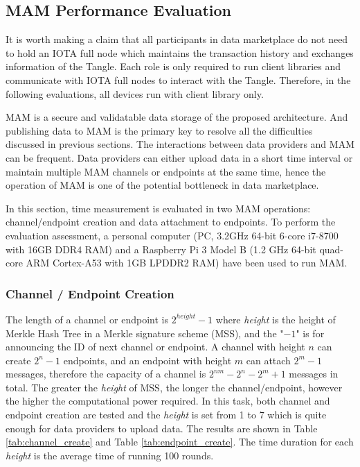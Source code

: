 \documentclass[conference]{IEEEtran}
\begin{document}
\subsection{MAM Performance Evaluation}
\label{section:mam_performance}
It is worth making a claim that all participants in data marketplace do not need to hold an IOTA full node which maintains the transaction history and exchanges information of the Tangle. Each role is only required to run client libraries and communicate with IOTA full nodes to interact with the Tangle. Therefore, in the following evaluations, all devices run with client library only.

MAM is a secure and validatable data storage of the proposed architecture. And publishing data to MAM is the primary key to resolve all the difficulties discussed in previous sections. The interactions between data providers and MAM can be frequent. Data providers can either upload data in a short time interval or maintain multiple MAM channels or endpoints at the same time, hence the operation of MAM is one of the potential bottleneck in data marketplace.

In this section, time measurement is evaluated in two MAM operations: channel/endpoint creation and data attachment to endpoints. To perform the evaluation assessment, a personal computer (PC, 3.2GHz 64-bit 6-core i7-8700 with 16GB DDR4 RAM) and a Raspberry Pi 3 Model B (1.2 GHz 64-bit quad-core ARM Cortex-A53 with 1GB LPDDR2 RAM) have been used to run MAM. 

\subsubsection{Channel / Endpoint Creation}
The length of a channel or endpoint is $2^{height}-1$ where \textit{height} is the height of Merkle Hash Tree in a Merkle signature scheme (MSS), and the "$-1$" is for announcing the ID of next channel or endpoint. A channel with height $n$ can create $2^n-1$ endpoints, and an endpoint with height $m$ can attach $2^m-1$ messages, therefore the capacity of a channel is $2^{nm}-2^n-2^m+1$ messages in total. The greater the \textit{height} of MSS, the longer the channel/endpoint, however the higher the computational power required. In this task, both channel and endpoint creation are tested and the \textit{height} is set from 1 to 7 which is quite enough for data providers to upload data. The results are shown in Table \ref{tab:channel_create} and Table \ref{tab:endpoint_create}. The time duration for each \textit{height} is the average time of running 100 rounds.
\end{document}
